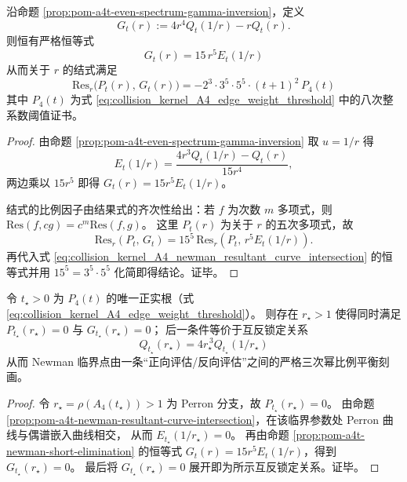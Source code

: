 \begin{proposition}\label{prop:pom-a4t-newman-short-elimination}
沿命题 \ref{prop:pom-a4t-even-spectrum-gamma-inversion}，定义
\[
G_t(r):=4r^4Q_t(1/r)-rQ_t(r).
\]
则恒有严格恒等式
\[
\boxed{\;G_t(r)=15\,r^5E_t(1/r)\;}
\]
从而关于 \(r\) 的结式满足
\[
\boxed{\;
\mathrm{Res}_r\!\bigl(P_t(r),\,G_t(r)\bigr)
=-2^3\cdot 3^5\cdot 5^5\cdot (t+1)^2\,P_4(t)\;}
\]
其中 \(P_4(t)\) 为式 \eqref{eq:collision_kernel_A4_edge_weight_threshold} 中的八次整系数阈值证书。
\end{proposition}
\begin{proof}
由命题 \ref{prop:pom-a4t-even-spectrum-gamma-inversion} 取 \(u=1/r\) 得
\[
E_t(1/r)=\frac{4r^3Q_t(1/r)-Q_t(r)}{15r^4},
\]
两边乘以 \(15r^5\) 即得 \(G_t(r)=15r^5E_t(1/r)\)。
\par
结式的比例因子由结果式的齐次性给出：若 \(f\) 为次数 \(m\) 多项式，则 \(\mathrm{Res}(f,cg)=c^{m}\mathrm{Res}(f,g)\)。
这里 \(P_t(r)\) 为关于 \(r\) 的五次多项式，故
\[
\mathrm{Res}_r(P_t,\,G_t)=15^5\,\mathrm{Res}_r(P_t,\,r^5E_t(1/r)).
\]
再代入式 \eqref{eq:collision_kernel_A4_newman_resultant_curve_intersection} 的恒等式并用 \(15^5=3^5\cdot 5^5\) 化简即得结论。证毕。
\end{proof}

\begin{proposition}\label{prop:pom-a4t-newman-reciprocal-locking}
令 \(t_\star>0\) 为 \(P_4(t)\) 的唯一正实根（式 \eqref{eq:collision_kernel_A4_edge_weight_threshold}）。
则存在 \(r_\star>1\) 使得同时满足 \(P_{t_\star}(r_\star)=0\) 与 \(G_{t_\star}(r_\star)=0\)；
后一条件等价于互反锁定关系
\[
\boxed{\;
Q_{t_\star}(r_\star)=4r_\star^{\,3}Q_{t_\star}(1/r_\star)\;}
\]
从而 Newman 临界点由一条“正向评估/反向评估”之间的严格三次幂比例平衡刻画。
\end{proposition}
\begin{proof}
令 \(r_\star=\rho(A_4(t_\star))>1\) 为 Perron 分支，故 \(P_{t_\star}(r_\star)=0\)。
由命题 \ref{prop:pom-a4t-newman-resultant-curve-intersection}，在该临界参数处 Perron 曲线与偶谱嵌入曲线相交，
从而 \(E_{t_\star}(1/r_\star)=0\)。
再由命题 \ref{prop:pom-a4t-newman-short-elimination} 的恒等式 \(G_t(r)=15r^5E_t(1/r)\)，得到 \(G_{t_\star}(r_\star)=0\)。
最后将 \(G_{t_\star}(r_\star)=0\) 展开即为所示互反锁定关系。证毕。
\end{proof}

